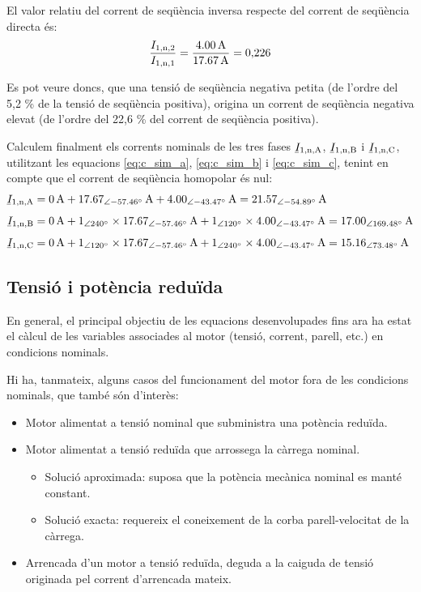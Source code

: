 \begin{exemple}
	El valor relatiu del corrent de seqüència inversa respecte del corrent de seqüència directa és:
	\[
		\frac{I_\mathrm{1,n,2}}{I_\mathrm{1,n,1}} = \frac{\qty{4,00}{A}}{\qty{17,67}{A}} = 0{,}226
	\]	
	
	Es pot veure doncs, que una tensió de seqüència negativa petita (de l'ordre del 5,2 \% de la tensió de seqüència positiva), origina un corrent de seqüència negativa elevat (de l'ordre del 22,6 \% del corrent de seqüència positiva). 
	
	Calculem finalment els corrents nominals de les tres fases $\cmplx{I}\ped{1,n,A}$, $\cmplx{I}\ped{1,n,B}$ i $\cmplx{I}\ped{1,n,C}$, utilitzant les equacions \eqref{eq:c_sim_a},
	\eqref{eq:c_sim_b} i \eqref{eq:c_sim_c}, tenint en compte que el corrent de seqüència homopolar és nul:
	\begin{align*}
		\cmplx{I}\ped{1,n,A} &= \qty{0}{A} + \qtypd{17,67}{-57,46}{A} +
		\qtypd{4,00}{-43,47}{A}  =
		\qtypd{21,57}{-54,89}{A} \\[1ex]
		\cmplx{I}\ped{1,n,B} &= \qty{0}{A} + \numpd{1}{240} \times
		\qtypd{17,67}{-57,46}{A} + \numpd{1}{120} \times
		\qtypd{4,00}{-43,47}{A}  =
		\qtypd{17,00}{169,48}{A}    \\[1ex]
		\cmplx{I}\ped{1,n,C} &= \qty{0}{A} + \numpd{1}{120} \times
		\qtypd{17,67}{-57,46}{A} +
		\numpd{1}{240} \times \qtypd{4,00}{-43,47}{A}  =
		\qtypd{15,16}{73,48}{A}
\end{align*}
	
\end{exemple}
	

\subsection{Tensió i potència reduïda}\label{sec:mot-tens-pot-red}

En general, el principal objectiu de les equacions desenvolupades fins ara ha estat  el càlcul de les variables associades al motor (tensió, corrent, parell, etc.) en condicions nominals.

Hi ha, tanmateix, alguns casos del funcionament del motor fora de les condicions nominals, que també són d'interès: 
\begin{itemize}
	\item  Motor alimentat a tensió nominal que subministra una potència reduïda.
	\item  Motor alimentat a tensió reduïda que arrossega la càrrega nominal.
	\begin{itemize}
		\item Solució aproximada: suposa que la potència mecànica nominal es manté constant.
		\item Solució exacta: requereix el coneixement de la corba parell-velocitat de la càrrega.
	\end{itemize}	
	\item Arrencada d'un motor a tensió reduïda, deguda a la caiguda de tensió originada pel corrent d'arrencada mateix.
\end{itemize}

